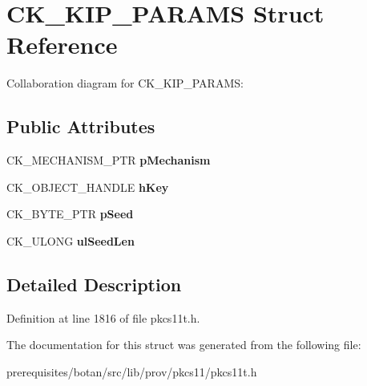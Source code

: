 \hypertarget{struct_c_k___k_i_p___p_a_r_a_m_s}{}\section{C\+K\+\_\+\+K\+I\+P\+\_\+\+P\+A\+R\+A\+MS Struct Reference}
\label{struct_c_k___k_i_p___p_a_r_a_m_s}


Collaboration diagram for C\+K\+\_\+\+K\+I\+P\+\_\+\+P\+A\+R\+A\+MS\+:
\subsection*{Public Attributes}
\begin{DoxyCompactItemize}
\item 
\mbox{\label{struct_c_k___k_i_p___p_a_r_a_m_s_ae2c9f533b73768561ea4fb994342dbf7}} 
C\+K\+\_\+\+M\+E\+C\+H\+A\+N\+I\+S\+M\+\_\+\+P\+TR {\bfseries p\+Mechanism}
\item 
\mbox{\label{struct_c_k___k_i_p___p_a_r_a_m_s_a80217053023d8fcb269e81cf349d6f2f}} 
C\+K\+\_\+\+O\+B\+J\+E\+C\+T\+\_\+\+H\+A\+N\+D\+LE {\bfseries h\+Key}
\item 
\mbox{\label{struct_c_k___k_i_p___p_a_r_a_m_s_aa02cbf703bf4b440204b219576d6872b}} 
C\+K\+\_\+\+B\+Y\+T\+E\+\_\+\+P\+TR {\bfseries p\+Seed}
\item 
\mbox{\label{struct_c_k___k_i_p___p_a_r_a_m_s_a6edf93be690ec6b728ffb62de917a5d0}} 
C\+K\+\_\+\+U\+L\+O\+NG {\bfseries ul\+Seed\+Len}
\end{DoxyCompactItemize}


\subsection{Detailed Description}


Definition at line 1816 of file pkcs11t.\+h.



The documentation for this struct was generated from the following file\+:\begin{DoxyCompactItemize}
\item 
prerequisites/botan/src/lib/prov/pkcs11/pkcs11t.\+h\end{DoxyCompactItemize}
